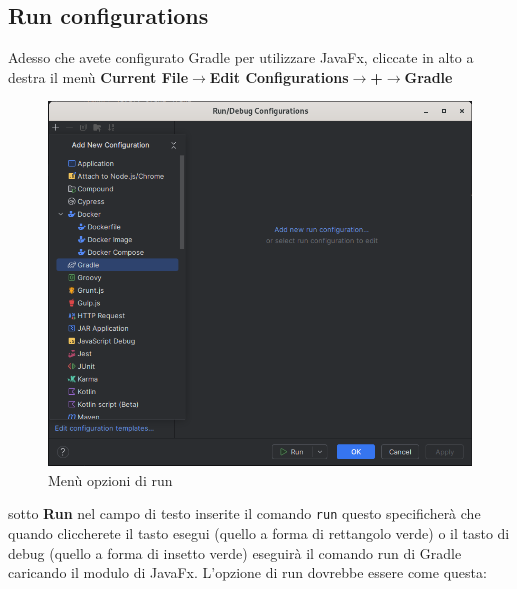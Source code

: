     \subsection{Run configurations}
        Adesso che avete configurato Gradle per utilizzare JavaFx, cliccate in alto a destra il menù \textbf{Current File$\rightarrow$Edit Configurations$\rightarrow$+$\rightarrow$Gradle}
        \begin{figure}[H]
            \centering
            \graphicspath{{src/capitoli/05/img/}}
            \includegraphics[width=\textwidth]{new_run_config.png}
            \caption{Menù opzioni di run}
            \label{fig:Menù opzioni di run}
        \end{figure}
        sotto \textbf{Run} nel campo di testo inserite il comando \texttt{run} questo specificherà che quando cliccherete il tasto esegui (quello a forma di 
        rettangolo verde) o il tasto di debug (quello a forma di insetto verde) eseguirà il comando run di Gradle caricando il modulo di JavaFx.
        L'opzione di run dovrebbe essere come questa:
